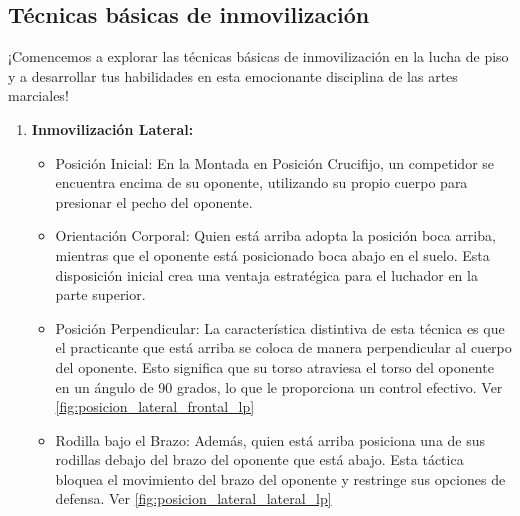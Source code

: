 \subsection{Técnicas básicas de inmovilización}

¡Comencemos a explorar las técnicas básicas de inmovilización en la lucha de piso y a desarrollar tus habilidades en esta emocionante disciplina de las artes marciales!


\begin{enumerate}
	\item \textbf{Inmovilización Lateral:}

	\begin{itemize}
		\item Posición Inicial: En la Montada en Posición Crucifijo, un competidor se encuentra encima de su oponente, utilizando su propio cuerpo para presionar el pecho del oponente.

		\item Orientación Corporal: Quien está arriba adopta la posición boca arriba, mientras que el oponente está posicionado boca abajo en el suelo. Esta disposición inicial crea una ventaja estratégica para el luchador en la parte superior.

		\item Posición Perpendicular: La característica distintiva de esta técnica es que el practicante que está arriba se coloca de manera perpendicular al cuerpo del oponente. Esto significa que su torso atraviesa el torso del oponente en un ángulo de 90 grados, lo que le proporciona un control efectivo. Ver \ref{fig:posicion_lateral_frontal_lp}

		\item Rodilla bajo el Brazo: Además, quien está arriba posiciona una de sus rodillas debajo del brazo del oponente que está abajo. Esta táctica bloquea el movimiento del brazo del oponente y restringe sus opciones de defensa. Ver \ref{fig:posicion_lateral_lateral_lp}
	\end{itemize}


\end{enumerate}
